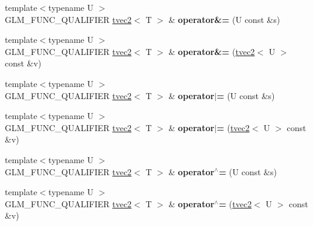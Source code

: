 \begin{DoxyCompactItemize}
\item 
\hypertarget{structglm_1_1detail_1_1tvec2_a0e24351d604ef07cf6a410f5a1379b39}{{\footnotesize template$<$typename U $>$ }\\G\-L\-M\-\_\-\-F\-U\-N\-C\-\_\-\-Q\-U\-A\-L\-I\-F\-I\-E\-R \hyperlink{structglm_1_1detail_1_1tvec2}{tvec2}$<$ T $>$ \& {\bfseries operator\&=} (U const \&s)}\label{structglm_1_1detail_1_1tvec2_a0e24351d604ef07cf6a410f5a1379b39}

\item 
\hypertarget{structglm_1_1detail_1_1tvec2_ac1fa283164396250b95e269a3a2a4792}{{\footnotesize template$<$typename U $>$ }\\G\-L\-M\-\_\-\-F\-U\-N\-C\-\_\-\-Q\-U\-A\-L\-I\-F\-I\-E\-R \hyperlink{structglm_1_1detail_1_1tvec2}{tvec2}$<$ T $>$ \& {\bfseries operator\&=} (\hyperlink{structglm_1_1detail_1_1tvec2}{tvec2}$<$ U $>$ const \&v)}\label{structglm_1_1detail_1_1tvec2_ac1fa283164396250b95e269a3a2a4792}

\item 
\hypertarget{structglm_1_1detail_1_1tvec2_a78eeb97a2cb7ea6fc34fea67f97275e6}{{\footnotesize template$<$typename U $>$ }\\G\-L\-M\-\_\-\-F\-U\-N\-C\-\_\-\-Q\-U\-A\-L\-I\-F\-I\-E\-R \hyperlink{structglm_1_1detail_1_1tvec2}{tvec2}$<$ T $>$ \& {\bfseries operator$\vert$=} (U const \&s)}\label{structglm_1_1detail_1_1tvec2_a78eeb97a2cb7ea6fc34fea67f97275e6}

\item 
\hypertarget{structglm_1_1detail_1_1tvec2_a22adb05ed8aaca90d76afbac9f0ed845}{{\footnotesize template$<$typename U $>$ }\\G\-L\-M\-\_\-\-F\-U\-N\-C\-\_\-\-Q\-U\-A\-L\-I\-F\-I\-E\-R \hyperlink{structglm_1_1detail_1_1tvec2}{tvec2}$<$ T $>$ \& {\bfseries operator$\vert$=} (\hyperlink{structglm_1_1detail_1_1tvec2}{tvec2}$<$ U $>$ const \&v)}\label{structglm_1_1detail_1_1tvec2_a22adb05ed8aaca90d76afbac9f0ed845}

\item 
\hypertarget{structglm_1_1detail_1_1tvec2_aa4f1d873eac0e0bbb75098c8dfb2feae}{{\footnotesize template$<$typename U $>$ }\\G\-L\-M\-\_\-\-F\-U\-N\-C\-\_\-\-Q\-U\-A\-L\-I\-F\-I\-E\-R \hyperlink{structglm_1_1detail_1_1tvec2}{tvec2}$<$ T $>$ \& {\bfseries operator$^\wedge$=} (U const \&s)}\label{structglm_1_1detail_1_1tvec2_aa4f1d873eac0e0bbb75098c8dfb2feae}

\item 
\hypertarget{structglm_1_1detail_1_1tvec2_a044083b585ddc318a228cbe6dea32027}{{\footnotesize template$<$typename U $>$ }\\G\-L\-M\-\_\-\-F\-U\-N\-C\-\_\-\-Q\-U\-A\-L\-I\-F\-I\-E\-R \hyperlink{structglm_1_1detail_1_1tvec2}{tvec2}$<$ T $>$ \& {\bfseries operator$^\wedge$=} (\hyperlink{structglm_1_1detail_1_1tvec2}{tvec2}$<$ U $>$ const \&v)}\label{structglm_1_1detail_1_1tvec2_a044083b585ddc318a228cbe6dea32027}


\end{DoxyCompactItemize}
